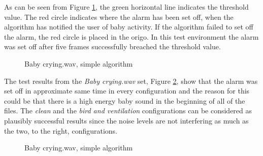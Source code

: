 As can be seen from Figure \ref{fig:bc1_simp_crop}, the green horizontal line
indicates the threshold value. The red circle indicates where the alarm
has been set off, when the algorithm has notified the user of baby activity. If
the algorithm failed to set off the alarm, the red circle is placed in the
origo. In this test environment the alarm was set off after five frames
successfully breached the threshold value.

\begin{figure}[H]
  \centering
  \caption{Baby crying.wav, simple algorithm}
  \label{fig:bc1_simp_crop}
\end{figure}

The test results from the \emph{Baby crying.wav} set, Figure
\ref{fig:bc1_simp}, show that the alarm was set off in approximate same time in
every configuration and the reason for this could be that there is a high
energy baby sound in the beginning of all of the files. The \emph{clean} and
the \emph{bird and ventilation} configurations can be considered as plausibly
successful results since the noise levels are not interfering as much as the
two, to the right, configurations.

\begin{figure}[H]
  \centering
  \caption{Baby crying.wav, simple algorithm}
  \label{fig:bc1_simp}
\end{figure}


